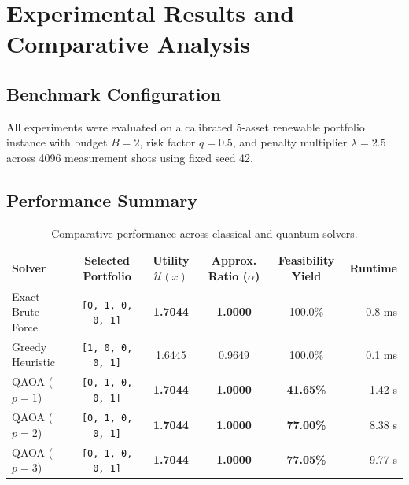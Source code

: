 \section{Experimental Results and Comparative Analysis}

\subsection{Benchmark Configuration}
All experiments were evaluated on a calibrated 5-asset renewable portfolio instance with budget $B=2$, risk factor $q=0.5$, and penalty multiplier $\lambda=2.5$ across 4096 measurement shots using fixed seed 42.

\subsection{Performance Summary}
\begin{table}[h]
\centering
\small
\begin{tabular}{lccccr}
\toprule
\textbf{Solver} & \textbf{Selected Portfolio} & \textbf{Utility $\mathcal{U}(x)$} & \textbf{Approx. Ratio ($\alpha$)} & \textbf{Feasibility Yield} & \textbf{Runtime} \\
\midrule
Exact Brute-Force & \texttt{[0, 1, 0, 0, 1]} & \textbf{1.7044} & \textbf{1.0000} & 100.0\% & 0.8 ms \\
Greedy Heuristic  & \texttt{[1, 0, 0, 0, 1]} & 1.6445          & 0.9649          & 100.0\% & 0.1 ms \\
QAOA ($p=1$)      & \texttt{[0, 1, 0, 0, 1]} & \textbf{1.7044} & \textbf{1.0000} & \textbf{41.65\%} & 1.42 s \\
QAOA ($p=2$)      & \texttt{[0, 1, 0, 0, 1]} & \textbf{1.7044} & \textbf{1.0000} & \textbf{77.00\%} & 8.38 s \\
QAOA ($p=3$)      & \texttt{[0, 1, 0, 0, 1]} & \textbf{1.7044} & \textbf{1.0000} & \textbf{77.05\%} & 9.77 s \\
\bottomrule
\end{tabular}
\caption{Comparative performance across classical and quantum solvers.}
\end{table}

